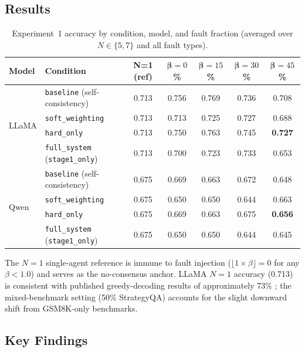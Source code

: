 \documentclass[11pt]{article}
\begin{document}
\subsection{Results}
\label{sec:exp1-results}

\begin{table}[!t]
\centering
\caption{Experiment~1 accuracy by condition, model, and fault fraction
  (averaged over $N \in \{5,7\}$ and all fault types).}
\label{tab:exp1-results}
\footnotesize
\setlength{\tabcolsep}{4.2pt}
\begin{tabularx}{\textwidth}{l X ccccc}
\toprule
\textbf{Model} & \textbf{Condition} & \textbf{N=1 (ref)} & $\bm{\beta}=0$\%
  & $\bm{\beta}=15$\% & $\bm{\beta}=30$\%
  & $\bm{\beta}=45$\% \\
\midrule
\multirow{4}{*}{LLaMA}
  & \texttt{baseline} (self-consistency) & 0.713 & 0.756 & 0.769 & 0.736 & 0.708 \\
  & \texttt{soft\_weighting}             & 0.713 & 0.713 & 0.725 & 0.727 & 0.688 \\
  & \texttt{hard\_only}                  & 0.713 & 0.750 & 0.763 & 0.745 & \textbf{0.727} \\
  & \texttt{full\_system} (\texttt{stage1\_only}) & 0.713 & 0.700 & 0.723 & 0.733 & 0.653 \\
\midrule
\multirow{4}{*}{Qwen}
  & \texttt{baseline} (self-consistency) & 0.675 & 0.669 & 0.663 & 0.672 & 0.648 \\
  & \texttt{soft\_weighting}             & 0.675 & 0.650 & 0.650 & 0.644 & 0.663 \\
  & \texttt{hard\_only}                  & 0.675 & 0.669 & 0.663 & 0.675 & \textbf{0.656} \\
  & \texttt{full\_system} (\texttt{stage1\_only}) & 0.675 & 0.650 & 0.650 & 0.644 & 0.645 \\
\bottomrule
\end{tabularx}
\end{table}

The $N=1$ single-agent reference is immune to fault injection
($\lfloor 1 \times \beta \rfloor = 0$ for any $\beta < 1.0$) and serves as the
no-consensus anchor. LLaMA $N=1$ accuracy (0.713) is consistent with published
greedy-decoding results of approximately 73\% \citep{metaai2024llama}; the
mixed-benchmark setting (50\% StrategyQA) accounts for the slight downward shift
from GSM8K-only benchmarks.

\subsection{Key Findings}
\label{sec:exp1-findings}
\end{document}
